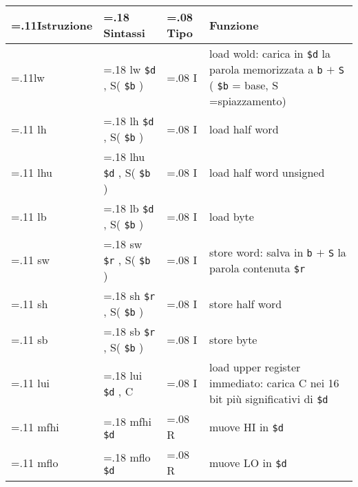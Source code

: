 \documentclass{standalone}
\providecommand\lightrule{%
	\arrayrulecolor{black!30}%
	\midrule[\lightrulewidth]%
	\arrayrulecolor{black}}
\providecommand\register[1]{%
	\texttt{#1}%
}
\begin{document}
\begin{tabularx}{\textwidth}{ >{\hsize=.11\textwidth}X >{\hsize=.18\textwidth}X >{\hsize=.08\textwidth}X X }
	\toprule
		Istruzione & Sintassi & Tipo & Funzione \\
	\midrule
		lw & lw \register{\$d}, S(\register{\$b}) & I & load wold: carica in \register{\$d} la parola memorizzata a \register{b}\(+\)\register{S} (\register{\$b} = base, S =spiazzamento) \\\lightrule
		lh & lh \register{\$d}, S(\register{\$b}) & I & load half word \\\lightrule
		lhu & lhu \register{\$d}, S(\register{\$b}) & I & load half word unsigned \\\lightrule
		lb & lb \register{\$d}, S(\register{\$b}) & I & load byte \\\lightrule
		sw & sw \register{\$r}, S(\register{\$b}) & I & store word: salva in \register{b}\(+\)\register{S} la parola contenuta \register{\$r} \\\lightrule
		sh & sh \register{\$r}, S(\register{\$b}) & I & store half word \\\lightrule
		sb & sb \register{\$r}, S(\register{\$b}) & I & store byte \\\lightrule
		lui & lui \register{\$d}, C & I &  load upper register immediato: carica C nei 16 bit più significativi di \register{\$d} \\\lightrule
		mfhi & mfhi \register{\$d} & R & muove HI in \register{\$d} \\\lightrule
		mflo & mflo \register{\$d} & R & muove LO in \register{\$d} \\
	\bottomrule
\end{tabularx}
\end{document}
